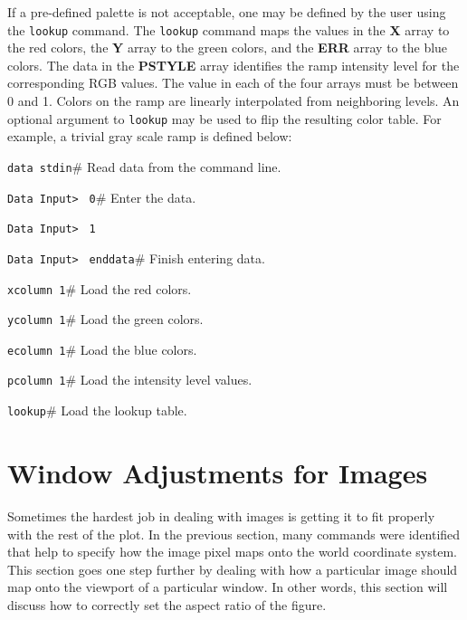 If a pre-defined palette is not acceptable, one may be defined by the
user using the
{\tt lookup}%
command.
The {\tt lookup} command maps
the values in the {\bf X} array to the red colors, the {\bf Y} array to
the green colors, and the {\bf ERR} array to the blue colors.
The data in the {\bf PSTYLE} array identifies the ramp intensity level
for the corresponding RGB values.
The value in each of the four arrays must be between 0 and 1.
Colors on the ramp are linearly interpolated from neighboring levels.
An optional argument to {\tt lookup} may be used to flip the resulting
color table.
For example, a trivial gray scale ramp is defined below:
\begin{wiplist}%
  \item {\tt data stdin}\hfill \# Read data from the command line.
\samepage
  \item [{\tt Data Input> }] {\tt 0}\hfill \# Enter the data.
  \item [{\tt Data Input> }] {\tt 1}
  \item [{\tt Data Input> }] {\tt enddata}\hfill \# Finish entering data.
  \item {\tt xcolumn 1}\hfill \# Load the red colors.
  \item {\tt ycolumn 1}\hfill \# Load the green colors.
  \item {\tt ecolumn 1}\hfill \# Load the blue colors.
  \item {\tt pcolumn 1}\hfill \# Load the intensity level values.
  \item {\tt lookup}\hfill \# Load the lookup table.
\end{wiplist}

\section		{Window Adjustments for Images}

Sometimes the hardest job in dealing with images is getting it to fit
properly with the rest of the plot.
In the previous section, many commands were identified that help to
specify how the image pixel maps onto the world coordinate
system.
This section goes one step further by dealing with how a
particular image should map onto the
viewport
of a particular window.
In other words, this section will discuss how to correctly set the
aspect ratio of the figure.


